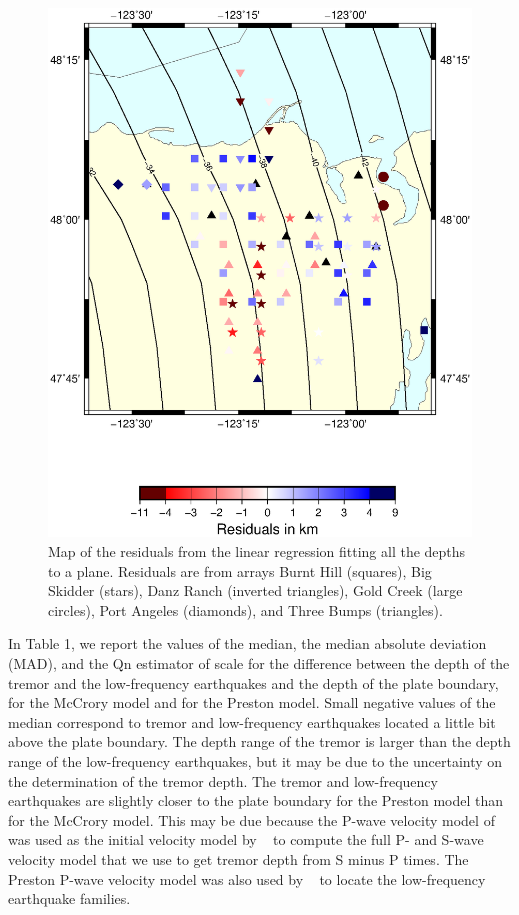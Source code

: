 \documentclass[draft]{agujournal2019}
\begin{document}
\begin{figure}
\noindent\includegraphics[width=\textwidth, trim={1cm 5cm 3.5cm 4cm},clip]{figures/error_PWS_PWS.eps}
\caption{Map of the residuals from the linear regression fitting all the depths to a plane. Residuals are from arrays Burnt Hill (squares), Big Skidder (stars), Danz Ranch (inverted triangles),  Gold Creek (large circles), Port Angeles (diamonds), and Three Bumps (triangles).}
\label{pngfiguresample}
\end{figure}

In Table 1, we report the values of the median, the median absolute deviation (MAD), and the Qn estimator of scale for the difference between the depth of the tremor and the low-frequency earthquakes and the depth of the plate boundary, for the McCrory model and for the Preston model. Small negative values of the median correspond to tremor and low-frequency earthquakes located a little bit above the plate boundary. The depth range of the tremor is larger than the depth range of the low-frequency earthquakes, but it may be due to the uncertainty on the determination of the tremor depth. The tremor and low-frequency earthquakes are slightly closer to the plate boundary for the Preston model than for the McCrory model. This may be due because the P-wave velocity model of ~ was used as the initial velocity model by ~ to compute the full P- and S-wave velocity model that we use to get tremor depth from S minus P times. The Preston P-wave velocity model was also used by ~ to locate the low-frequency earthquake families. \\
\end{document}
